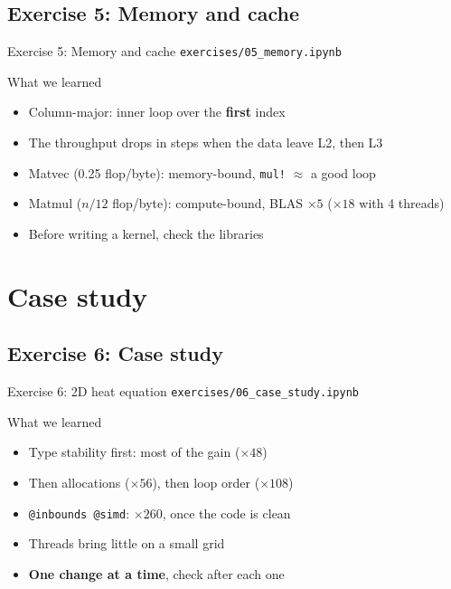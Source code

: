 \subsection{Exercise 5: Memory and cache}

\begin{frame}{Exercise 5: Memory and cache}
    \texttt{exercises/05\_memory.ipynb}

    \pause\bigskip

    \begin{BlockGreen}{What we learned}
        \begin{itemize}
            \item Column-major: inner loop over the \textbf{first} index
            \item The throughput drops in steps when the data leave L2, then L3
            \item Matvec (0.25 flop/byte): memory-bound, \texttt{mul!} \( \approx \) a good loop
            \item Matmul (\( n/12 \) flop/byte): compute-bound, BLAS \( \times 5 \) (\( \times 18 \) with 4 threads)
            \item \alert{Before writing a kernel, check the libraries}
        \end{itemize}
    \end{BlockGreen}
\end{frame}

\section{Case study}

\subsection{Exercise 6: Case study}

\begin{frame}{Exercise 6: 2D heat equation}
    \texttt{exercises/06\_case\_study.ipynb}

    \pause\bigskip

    \begin{BlockGreen}{What we learned}
        \begin{itemize}
            \item Type stability first: most of the gain (\( \times 48 \))
            \item Then allocations (\( \times 56 \)), then loop order (\( \times 108 \))
            \item \texttt{@inbounds @simd}: \( \times 260 \), once the code is clean
            \item Threads bring little on a small grid
            \item \textbf{One change at a time}, check after each one
        \end{itemize}
    \end{BlockGreen}
\end{frame}

